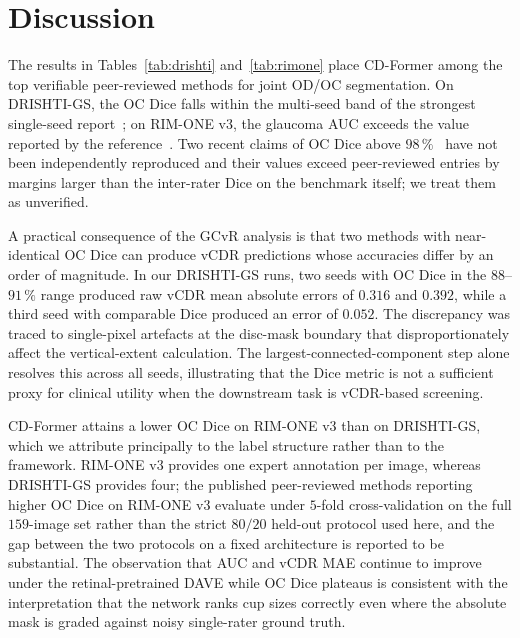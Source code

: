 \documentclass[10pt,journal,twocolumn]{IEEEtran}
\begin{document}
\section{Discussion}

The results in Tables~\ref{tab:drishti} and~\ref{tab:rimone} place CD-Former among the top verifiable peer-reviewed methods for joint OD/OC segmentation. On DRISHTI-GS, the OC Dice falls within the multi-seed band of the strongest single-seed report~\cite{edcoatunet2025}; on RIM-ONE v3, the glaucoma AUC exceeds the value reported by the reference~\cite{li2023rdcnn}. Two recent claims of OC Dice above $98\,\%$~\cite{dbsegnet2025,dualoptitrans2026} have not been independently reproduced and their values exceed peer-reviewed entries by margins larger than the inter-rater Dice on the benchmark itself; we treat them as unverified.

A practical consequence of the GCvR analysis is that two methods with near-identical OC Dice can produce vCDR predictions whose accuracies differ by an order of magnitude. In our DRISHTI-GS runs, two seeds with OC Dice in the $88$--$91\,\%$ range produced raw vCDR mean absolute errors of $0.316$ and $0.392$, while a third seed with comparable Dice produced an error of $0.052$. The discrepancy was traced to single-pixel artefacts at the disc-mask boundary that disproportionately affect the vertical-extent calculation. The largest-connected-component step alone resolves this across all seeds, illustrating that the Dice metric is not a sufficient proxy for clinical utility when the downstream task is vCDR-based screening.

CD-Former attains a lower OC Dice on RIM-ONE v3 than on DRISHTI-GS, which we attribute principally to the label structure rather than to the framework. RIM-ONE v3 provides one expert annotation per image, whereas DRISHTI-GS provides four; the published peer-reviewed methods reporting higher OC Dice on RIM-ONE v3 evaluate under $5$-fold cross-validation on the full $159$-image set rather than the strict $80/20$ held-out protocol used here, and the gap between the two protocols on a fixed architecture is reported to be substantial. The observation that AUC and vCDR MAE continue to improve under the retinal-pretrained DAVE while OC Dice plateaus is consistent with the interpretation that the network ranks cup sizes correctly even where the absolute mask is graded against noisy single-rater ground truth.
\end{document}
